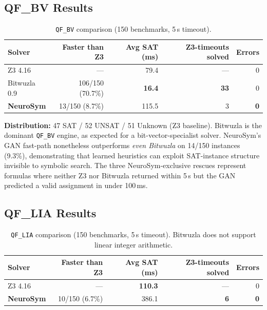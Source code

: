 \documentclass[10pt,a4paper]{article}
\begin{document}
\subsection{QF\_BV Results}

\begin{table}[h]
\centering
\caption{\texttt{QF\_BV} comparison (150 benchmarks, 5\,s timeout).}
\label{tab:qfbv}
\begin{tabular}{@{}lrrrr@{}}
\toprule
\textbf{Solver} & \textbf{Faster than Z3} & \textbf{Avg SAT (ms)} &
\textbf{Z3-timeouts solved} & \textbf{Errors} \\
\midrule
Z3 4.16           & ---              & 79.4  & ---  & 0 \\
Bitwuzla 0.9      & 106/150 (70.7\%) & \textbf{16.4}  & \textbf{33}   & 0 \\
\textbf{NeuroSym} & 13/150 (8.7\%)   & 115.5 &  3   & \textbf{0} \\
\bottomrule
\end{tabular}
\end{table}

\noindent \textbf{Distribution:} 47 SAT / 52 UNSAT / 51 Unknown (Z3 baseline).
Bitwuzla is the dominant \texttt{QF\_BV} engine, as expected for a
bit-vector-specialist solver.  NeuroSym's GAN fast-path nonetheless
outperforms \emph{even Bitwuzla} on 14/150 instances (9.3\%), demonstrating
that learned heuristics can exploit SAT-instance structure invisible to
symbolic search.  The three NeuroSym-exclusive rescues represent formulas
where neither Z3 nor Bitwuzla returned within 5\,s but the GAN predicted a
valid assignment in under 100\,ms.

\subsection{QF\_LIA Results}

\begin{table}[h]
\centering
\caption{\texttt{QF\_LIA} comparison (150 benchmarks, 5\,s timeout).
         Bitwuzla does not support linear integer arithmetic.}
\label{tab:qflia}
\begin{tabular}{@{}lrrrr@{}}
\toprule
\textbf{Solver} & \textbf{Faster than Z3} & \textbf{Avg SAT (ms)} &
\textbf{Z3-timeouts solved} & \textbf{Errors} \\
\midrule
Z3 4.16           & ---             & \textbf{110.3} & ---           & 0 \\
\textbf{NeuroSym} & 10/150 (6.7\%) & 386.1          & \textbf{6}    & \textbf{0} \\
\bottomrule
\end{tabular}
\end{table}
\end{document}
